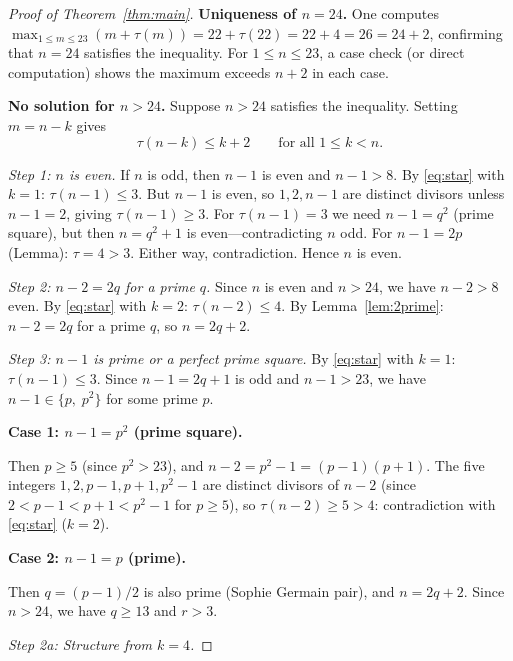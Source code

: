 \documentclass[11pt]{article}
\begin{document}
\begin{proof}[Proof of Theorem~\ref{thm:main}]

\noindent\textbf{Uniqueness of $n = 24$.}
One computes $\max_{1 \le m \le 23}(m + \tau(m)) = 22 + \tau(22) = 22 + 4 = 26 = 24 + 2$,
confirming that $n = 24$ satisfies the inequality.  For $1 \le n \le 23$, a case
check (or direct computation) shows the maximum exceeds $n + 2$ in each case.

\bigskip
\noindent\textbf{No solution for $n > 24$.}
Suppose $n > 24$ satisfies the inequality. Setting $m = n - k$ gives
\begin{equation}\label{eq:star}
  \tau(n-k) \le k + 2 \qquad \text{for all } 1 \le k < n. \tag{$*$}
\end{equation}

\medskip
\noindent\textit{Step 1: $n$ is even.}
If $n$ is odd, then $n - 1$ is even and $n - 1 > 8$.
By \eqref{eq:star} with $k = 1$: $\tau(n-1) \le 3$.
But $n - 1$ is even, so $1, 2, n-1$ are distinct divisors unless $n - 1 = 2$,
giving $\tau(n-1) \ge 3$.  For $\tau(n-1) = 3$ we need $n - 1 = q^2$ (prime
square), but then $n = q^2 + 1$ is even---contradicting $n$ odd.
For $n - 1 = 2p$ (Lemma): $\tau = 4 > 3$.  Either way, contradiction.
Hence $n$ is even.

\medskip
\noindent\textit{Step 2: $n - 2 = 2q$ for a prime $q$.}
Since $n$ is even and $n > 24$, we have $n - 2 > 8$ even.
By \eqref{eq:star} with $k = 2$: $\tau(n-2) \le 4$.
By Lemma~\ref{lem:2prime}: $n - 2 = 2q$ for a prime $q$, so $n = 2q + 2$.

\medskip
\noindent\textit{Step 3: $n - 1$ is prime or a perfect prime square.}
By \eqref{eq:star} with $k = 1$: $\tau(n-1) \le 3$.
Since $n - 1 = 2q + 1$ is odd and $n - 1 > 23$, we have $n - 1 \in \{p,\; p^2\}$
for some prime $p$.

\medskip
\noindent\textbf{Case 1: $n - 1 = p^2$ (prime square).}

Then $p \ge 5$ (since $p^2 > 23$), and
$n - 2 = p^2 - 1 = (p-1)(p+1)$.
The five integers $1, 2, p-1, p+1, p^2-1$ are distinct divisors of $n - 2$
(since $2 < p - 1 < p + 1 < p^2 - 1$ for $p \ge 5$), so $\tau(n-2) \ge 5 > 4$:
contradiction with \eqref{eq:star} ($k = 2$).

\medskip
\noindent\textbf{Case 2: $n - 1 = p$ (prime).}

Then $q = (p-1)/2$ is also prime (Sophie Germain pair), and $n = 2q + 2$.
Since $n > 24$, we have $q \ge 13$ and $r > 3$.

\medskip
\noindent\textit{Step 2a: Structure from $k = 4$.}


\end{proof}
\end{document}
